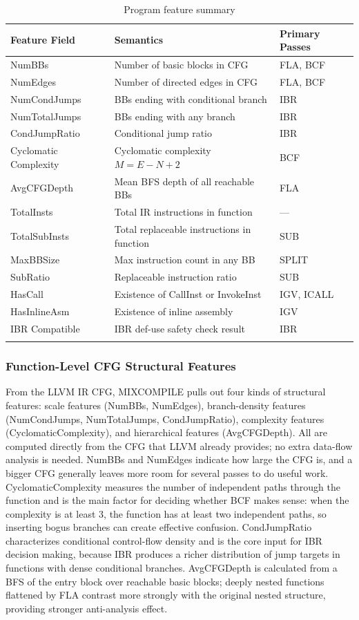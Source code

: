 \documentclass[pdflatex,sn-mathphys-num]{sn-jnl}
\theoremstyle{thmstyleone}%
\theoremstyle{thmstyletwo}%
\theoremstyle{thmstylethree}%
\begin{document}
\begin{table}[!t]
\centering
\footnotesize
\caption{Program feature summary}
\label{tab:features}
\begin{tabular*}{\textwidth}{@{\extracolsep\fill}lll@{}}
\toprule
Feature Field & Semantics & Primary Passes  \\
\midrule
NumBBs & Number of basic blocks in CFG & FLA, BCF  \\
NumEdges & Number of directed edges in CFG & FLA, BCF  \\
NumCondJumps & BBs ending with conditional branch & IBR \\
NumTotalJumps & BBs ending with any branch & IBR \\
CondJumpRatio & Conditional jump ratio  & IBR  \\
Cyclomatic Complexity & Cyclomatic complexity $M = E - N + 2$ & BCF \\
AvgCFGDepth & Mean BFS depth of all reachable BBs & FLA  \\
TotalInsts & Total IR instructions in function & ---  \\
TotalSubInsts & Total replaceable instructions in function & SUB \\
MaxBBSize & Max instruction count in any BB & SPLIT  \\
SubRatio & Replaceable instruction ratio & SUB \\
HasCall & Existence of CallInst or InvokeInst & IGV, ICALL \\
HasInlineAsm & Existence of inline assembly & IGV \\
IBR Compatible & IBR def-use safety check result & IBR \\
\botrule
\end{tabular*}
\end{table}

\subsubsection{Function-Level CFG Structural Features}

From the LLVM IR CFG, MIXCOMPILE pulls out four kinds of structural features: scale
features (NumBBs, NumEdges), branch-density features (NumCondJumps, NumTotalJumps,
CondJumpRatio), complexity features (CyclomaticComplexity), and hierarchical features
(AvgCFGDepth). All are computed directly from the CFG that LLVM already provides; no
extra data-flow analysis is needed. NumBBs and NumEdges indicate how large the CFG is,
and a bigger CFG generally leaves more room for several passes to do useful work.
CyclomaticComplexity measures the number of independent paths through the function and
is the main factor for deciding whether BCF makes sense: when the complexity is at
least 3, the function has at least two independent paths, so inserting bogus branches
can create effective confusion. CondJumpRatio characterizes conditional control-flow
density and is the core input for IBR decision making, because IBR produces a richer
distribution of jump targets in functions with dense conditional branches. AvgCFGDepth
is calculated from a BFS of the entry block over reachable basic blocks; deeply nested
functions flattened by FLA contrast more strongly with the original nested structure,
providing stronger anti-analysis effect.
\end{document}
